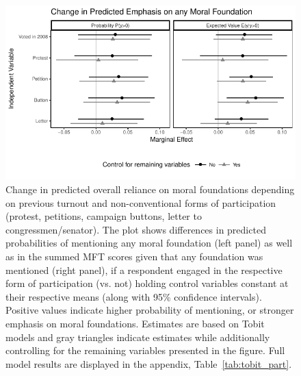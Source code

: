 \documentclass[12pt]{article}
\begin{document}
\begin{figure}[h]\centering
\includegraphics{../calc/fig/tobit_part.pdf}
\caption{Change in predicted overall reliance on moral foundations depending on previous turnout and non-conventional forms of participation (protest, petitions, campaign buttons, letter to congressmen/senator). The plot shows differences in predicted probabilities of mentioning any moral foundation (left panel) as well as in the summed MFT scores given that any foundation was mentioned (right panel), if a respondent engaged in the respective form of participation (vs. not) holding control variables constant at their respective means (along with 95\% confidence intervals). Positive values indicate higher probability of mentioning, or stronger emphasis on moral foundations. Estimates are based on Tobit models and gray triangles indicate estimates while additionally controlling for the remaining variables presented in the figure. Full model results are displayed in the appendix, Table~\ref{tab:tobit_part}.
}\label{fig:tobit_part}
\end{figure}
\end{document}

